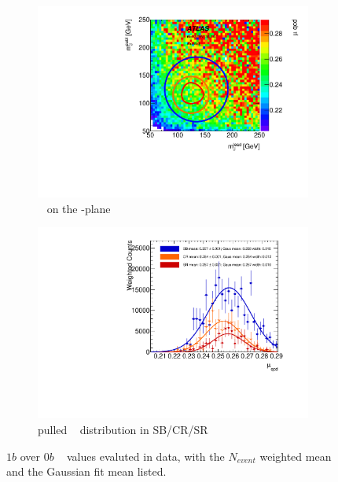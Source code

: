 \begin{figure}[htbp!]
\centering
\captionsetup{justification=centering}
	\hspace{-1cm}
    \begin{subfigure}[b]{0.4\textwidth}
        \includegraphics[width=\textwidth,angle=-90]{figures/boosted/AppendixMuqcdstudy/OneTag_Incl_mH0H1.pdf}
        \caption{\muqcd~ on the \mleadJ-\msublJ plane}
        \label{fig:app-muqcd-1b-2d}
    \end{subfigure}
    \quad \quad \quad \quad 
    \begin{subfigure}[b]{0.4\textwidth}
        \includegraphics[width=\textwidth,angle=-90]{figures/boosted/AppendixMuqcdstudy/OneTag_Incl_mH0H1_pull.pdf}
        \caption{pulled \muqcd~ distribution in SB/CR/SR}
        \label{fig:app-muqcd-1b-pull}
    \end{subfigure}
\caption{$1b$ over $0b$ \muqcd~ values evaluted in data, with the $N_{event}$ weighted mean and the Gaussian fit mean listed.}
\label{fig:app-muqcd-1b}
\end{figure}

